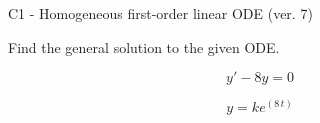\begin{exercise}
  \begin{exerciseTitle}C1 - Homogeneous first-order linear ODE (ver. 7)\end{exerciseTitle}
  \begin{exerciseStatement}
    
Find the general solution to the given ODE.

    
\[y'-8y=0\]

  \end{exerciseStatement}
  \begin{exerciseAnswer}
    
\[y= k e^{\left(8 \, t\right)}\]

  \end{exerciseAnswer}
\end{exercise}